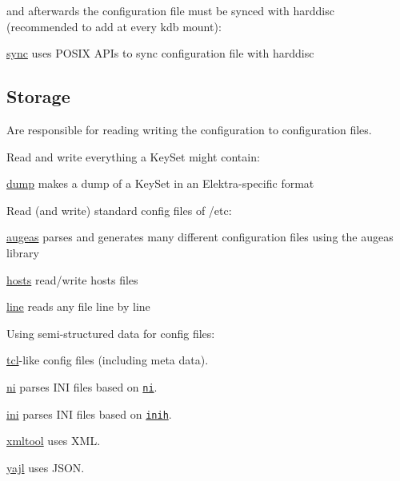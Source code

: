and afterwards the configuration file must be synced with harddisc (recommended to add at every kdb mount)\+:


\begin{DoxyItemize}
\item \hyperlink{md_src_plugins_sync_README_src_plugins_sync_README_md}{sync} uses P\+O\+S\+I\+X A\+P\+Is to sync configuration file with harddisc
\end{DoxyItemize}

\subsection*{Storage}

Are responsible for reading writing the configuration to configuration files.

Read and write everything a Key\+Set might contain\+:


\begin{DoxyItemize}
\item \hyperlink{md_src_plugins_dump_README_src_plugins_dump_README_md}{dump} makes a dump of a Key\+Set in an Elektra-\/specific format
\end{DoxyItemize}

Read (and write) standard config files of /etc\+:


\begin{DoxyItemize}
\item \hyperlink{md_src_plugins_augeas_README_src_plugins_augeas_README_md}{augeas} parses and generates many different configuration files using the augeas library
\item \hyperlink{md_src_plugins_hosts_README_src_plugins_hosts_README_md}{hosts} read/write hosts files
\item \hyperlink{md_src_plugins_line_README_src_plugins_line_README_md}{line} reads any file line by line
\end{DoxyItemize}

Using semi-\/structured data for config files\+:


\begin{DoxyItemize}
\item \hyperlink{md_src_plugins_tcl_README_src_plugins_tcl_README_md}{tcl}-\/like config files (including meta data).
\item \hyperlink{md_src_plugins_ni_README_src_plugins_ni_README_md}{ni} parses I\+N\+I files based on \href{https://github.com/chazomaticus/bohr/blob/master/include/bohr/ni.h}{\tt ni}.
\item \hyperlink{md_src_plugins_ini_README_src_plugins_ini_README_md}{ini} parses I\+N\+I files based on \href{http://code.google.com/p/inih/}{\tt inih}.
\item \hyperlink{md_src_plugins_xmltool_README_src_plugins_xmltool_README_md}{xmltool} uses X\+M\+L.
\item \hyperlink{md_src_plugins_yajl_README_src_plugins_yajl_README_md}{yajl} uses J\+S\+O\+N.
\end{DoxyItemize}

